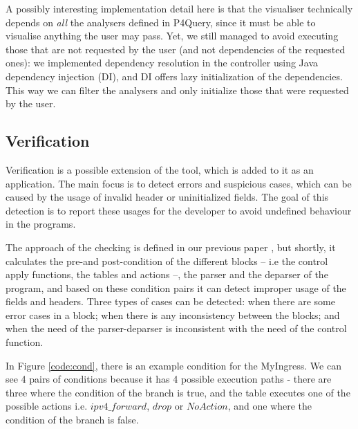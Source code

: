 \documentclass[sigconf]{acmart}
\begin{document}
  A possibly interesting implementation detail here is that the visualiser technically depends on \textit{all} the analysers defined in P4Query, since it must be able to visualise anything the user may pass. Yet, we still managed to avoid executing those that are not requested by the user (and not dependencies of the requested ones): we implemented dependency resolution in the controller using Java dependency injection (DI), and DI offers lazy initialization of the dependencies. This way we can filter the analysers and only initialize those that were requested by the user.

  \subsection{Verification} %
  Verification is a possible extension of the tool, which is added to it as an application. The main focus is to detect errors and suspicious cases, which can be caused by the usage of invalid header or uninitialized fields. The goal of this detection is to report these usages for the developer to avoid undefined behaviour in the programs. 
  
  The approach of the checking is defined in our previous paper \cite{ownCheck}, but shortly, it calculates the pre-and post-condition of the different blocks -- i.e the control apply functions, the tables and actions --, the parser and the deparser of the program, and based on these condition pairs it can detect improper usage of the fields and headers. Three types of cases can be detected: when there are some error cases in a block; when there is any inconsistency between the blocks; and when the need of the parser-deparser is inconsistent with the need of the control function.
  
  In Figure \ref{code:cond}, there is an example condition for the MyIngress. We can see 4 pairs of conditions because it has 4 possible execution paths - there are three where the condition of the branch is true, and the table executes one of the possible actions i.e. $\mathit{ipv4\_forward}$, $\mathit{drop}$ or $\mathit{NoAction}$, and one where the condition of the branch is false.
  
\end{document}

